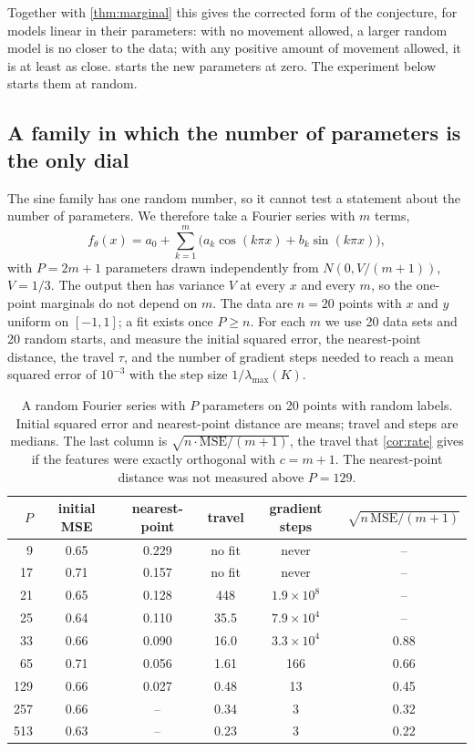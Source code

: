 Together with \cref{thm:marginal} this gives the corrected form of the
conjecture, for models linear in their parameters: with no movement allowed, a
larger random model is no closer to the data; with any positive amount of
movement allowed, it is at least as close.  starts the new
parameters at zero. The experiment below starts them at random.

\subsection{A family in which the number of parameters is the only dial}
\label{sec:fourier}

The sine family has one random number, so it cannot test a statement about the
number of parameters. We therefore take a Fourier series with $m$ terms,
\[
  f_\theta(x)=a_0+\sum_{k=1}^{m}\bigl(a_k\cos(k\pi x)+b_k\sin(k\pi x)\bigr),
\]
with $P=2m+1$ parameters drawn independently from $N(0,V/(m+1))$, $V=1/3$. The
output then has variance $V$ at every $x$ and every $m$, so the one-point
marginals do not depend on $m$. The data are $n=20$ points with $x$ and $y$
uniform on $[-1,1]$; a fit exists once $P\ge n$. For each $m$ we use 20 data
sets and 20 random starts, and measure the initial squared error, the
nearest-point distance, the travel $\tau$, and the number of gradient steps
needed to reach a mean squared error of $10^{-3}$ with the step size
$1/\lambda_{\max}(K)$.

\begin{table}[t]
  \caption{A random Fourier series with $P$ parameters on 20 points with random
  labels. Initial squared error and nearest-point distance are means; travel
  and steps are medians. The last column is $\sqrt{n\cdot\mathrm{MSE}/(m+1)}$,
  the travel that \cref{cor:rate} gives if the features were exactly orthogonal
  with $c=m+1$. The nearest-point distance was not measured above $P=129$.}
  \label{tab:fourier}
  \centering
  \begin{tabular}{rccccc}
    \toprule
    $P$ & initial MSE & nearest-point & travel & gradient steps & $\sqrt{n\,\mathrm{MSE}/(m+1)}$ \\
    \midrule
      9 & 0.65 & 0.229 & no fit & never & -- \\
     17 & 0.71 & 0.157 & no fit & never & -- \\
     21 & 0.65 & 0.128 & 448    & $1.9\times10^{8}$ & -- \\
     25 & 0.64 & 0.110 & 35.5   & $7.9\times10^{4}$ & -- \\
     33 & 0.66 & 0.090 & 16.0   & $3.3\times10^{4}$ & 0.88 \\
     65 & 0.71 & 0.056 & 1.61   & 166 & 0.66 \\
    129 & 0.66 & 0.027 & 0.48   & 13  & 0.45 \\
    257 & 0.66 & --    & 0.34   & 3   & 0.32 \\
    513 & 0.63 & --    & 0.23   & 3   & 0.22 \\
    \bottomrule
  \end{tabular}
\end{table}

